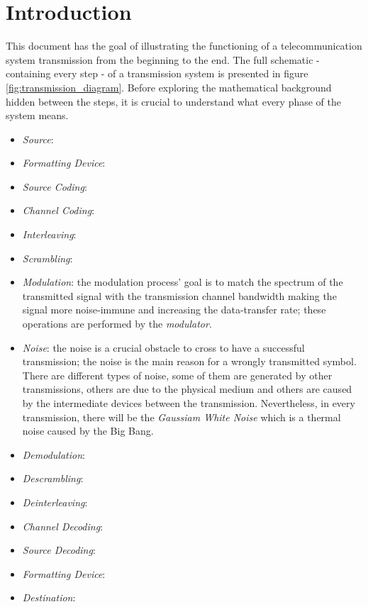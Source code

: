 \section{Introduction}

This document has the goal of illustrating the functioning of a telecommunication system transmission from the beginning to the end. The full schematic - containing every step - of a transmission system is presented in figure \ref{fig:transmission_diagram}. Before exploring the mathematical background hidden between the steps, it is crucial to understand what every phase of the system means.

\begin{itemize}
\renewcommand{\labelitemi}{$\diamond$}
    \item \textsl{Source}: 
    \item \textsl{Formatting Device}:
    \item \textsl{Source Coding}:
    \item \textsl{Channel Coding}:
    \item \textsl{Interleaving}:
    \item \textsl{Scrambling}:
    \item \textsl{Modulation}: the modulation process' goal is to match the spectrum of the transmitted signal with the transmission channel bandwidth making the signal more noise-immune and increasing the data-transfer rate; these operations are performed by the \textit{modulator}.
    \item \textsl{Noise}: the noise is a crucial obstacle to cross to have a successful transmission; the noise is the main reason for a wrongly transmitted symbol. There are different types of noise, some of them are generated by other transmissions, others are due to the physical medium and others are caused by the intermediate devices between the transmission. Nevertheless, in every transmission, there will be the \textsl{Gaussiam White Noise} which is a thermal noise caused by the Big Bang.
    \item \textsl{Demodulation}:
    \item \textsl{Descrambling}:
    \item \textsl{Deinterleaving}:
    \item \textsl{Channel Decoding}:
    \item \textsl{Source Decoding}:
    \item \textsl{Formatting Device}:
    \item \textsl{Destination}:
\end{itemize}









